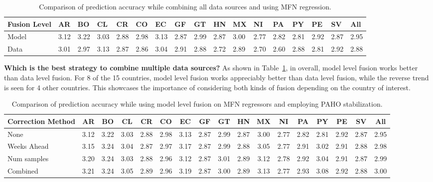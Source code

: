 \begin{table}
  \scriptsize
  \centering
  \caption{\label{tb:comparison_ensemble}Comparison of prediction accuracy while combining all data sources
  and using MFN regression.}
\vspace{-1em}
  \begin{tabular}{|p{1.5cm}|*{16}{l|}}
\hline
Fusion Level& AR & BO & CL & CR & CO & EC & GF & GT & HN & MX & NI & PA & PY & PE & SV & All\\
\hline \hline
Model       &3.12&3.22&3.03&2.88&2.98&3.13&2.87&2.99&2.87&3.00&2.77&2.82&2.81&2.92&2.87&2.95\\ 
Data        &3.01&2.97&3.13&2.87&2.86&3.04&2.91&2.88&2.72&2.89&2.70&2.60&2.88&2.81&2.92&2.88\\ 
\hline
\end{tabular}
\end{table}

{\noindent \textbf{Which is the best strategy to combine
multiple data sources?}} 
As shown in Table~\ref{tb:comparison_ensemble}, in overall,
model level fusion works better than data level fusion.
For 8 of the 15 countries, model level fusion works
appreciably better than data level fusion, while the reverse trend is seen for 4 other countries. 
This showcases the importance of considering both kinds of fusion depending on the country of interest.

\begin{table}[tb!]
  \scriptsize
  \centering
  \caption{\label{tb:moving} Comparison of prediction accuracy while using model level fusion 
  on MFN regressors and employing PAHO stabilization.}
\vspace{-1em}
\begin{tabular}{|p{1.5cm}|*{16}{c|}}
\hline
Correction Method& AR & BO & CL & CR & CO & EC & GF & GT & HN & MX & NI & PA & PY & PE & SV & All\\
\hline \hline
None             &3.12&3.22&3.03&2.88&2.98&3.13&2.87&2.99&2.87&3.00&2.77&2.82&2.81&2.92&2.87&2.95\\ \hline
Weeks Ahead      &3.15&3.24&3.04&2.87&2.97&3.17&2.87&2.99&2.88&3.05&2.77&2.91&3.02&2.91&2.88&2.98\\ \hline 
Num samples      &3.20&3.24&3.03&2.88&2.96&3.12&2.87&3.01&2.89&3.12&2.78&2.92&3.04&2.91&2.87&2.99\\ \hline
Combined         &3.21&3.24&3.05&2.89&2.96&3.19&2.87&3.00&2.89&3.13&2.77&2.93&3.08&2.92&2.88&3.00\\ 
\hline
\end{tabular}
\end{table}


